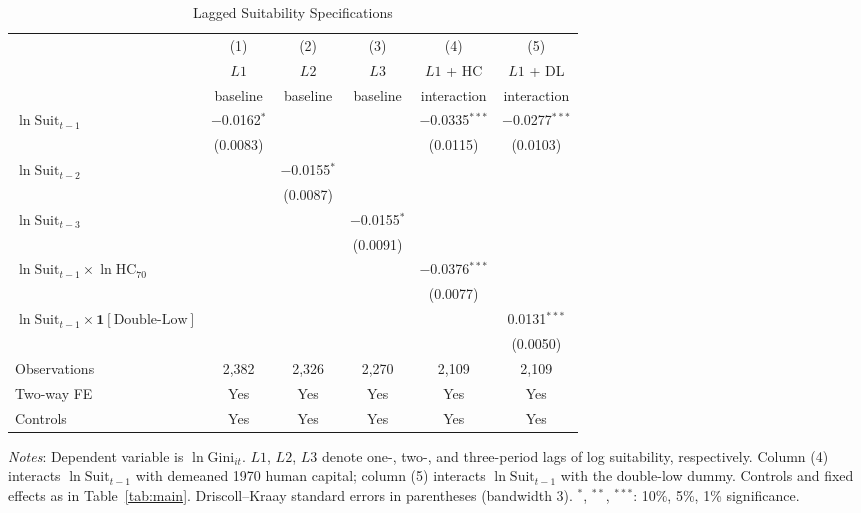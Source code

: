 \documentclass[12pt]{article}
\newcommand{\suit}{\mathrm{Suit}}
\newcommand{\gini}{\mathrm{Gini}}
\newcommand{\hc}{\mathrm{HC}}
\begin{document}
\begin{table}[H]
\centering
\begin{threeparttable}
\caption{Lagged Suitability Specifications}
\label{tab:lags}
\small
\begin{tabular}{l*{5}{c}}
\toprule
 & (1) & (2) & (3) & (4) & (5) \\
 & $L1$ & $L2$ & $L3$ & $L1$ + HC & $L1$ + DL \\
 & baseline & baseline & baseline & interaction & interaction \\
\midrule
$\ln \suit_{t-1}$
  & $-$0.0162$^{*}$ & & & $-$0.0335$^{***}$ & $-$0.0277$^{***}$ \\
  & (0.0083) & & & (0.0115) & (0.0103) \\[4pt]
$\ln \suit_{t-2}$
  & & $-$0.0155$^{*}$ & & & \\
  & & (0.0087) & & & \\[4pt]
$\ln \suit_{t-3}$
  & & & $-$0.0155$^{*}$ & & \\
  & & & (0.0091) & & \\[4pt]
$\ln \suit_{t-1} \times \ln \hc_{70}$
  & & & & $-$0.0376$^{***}$ & \\
  & & & & (0.0077) & \\[4pt]
$\ln \suit_{t-1} \times \mathbf{1}[\text{Double-Low}]$
  & & & & & 0.0131$^{***}$ \\
  & & & & & (0.0050) \\[4pt]
\midrule
Observations & 2,382 & 2,326 & 2,270 & 2,109 & 2,109 \\
Two-way FE   & Yes & Yes & Yes & Yes & Yes \\
Controls     & Yes & Yes & Yes & Yes & Yes \\
\bottomrule
\end{tabular}
\begin{tablenotes}
\footnotesize
\item \textit{Notes}: Dependent variable is $\ln\gini_{it}$.
$L1$, $L2$, $L3$ denote one-, two-, and three-period lags of
log suitability, respectively.
Column (4) interacts $\ln\suit_{t-1}$ with demeaned 1970 human capital;
column (5) interacts $\ln\suit_{t-1}$ with the double-low dummy.
Controls and fixed effects as in Table~\ref{tab:main}.
Driscoll--Kraay standard errors in parentheses (bandwidth 3).
$^{*}$, $^{**}$, $^{***}$: 10\%, 5\%, 1\% significance.
\end{tablenotes}
\end{threeparttable}
\end{table}
\end{document}
